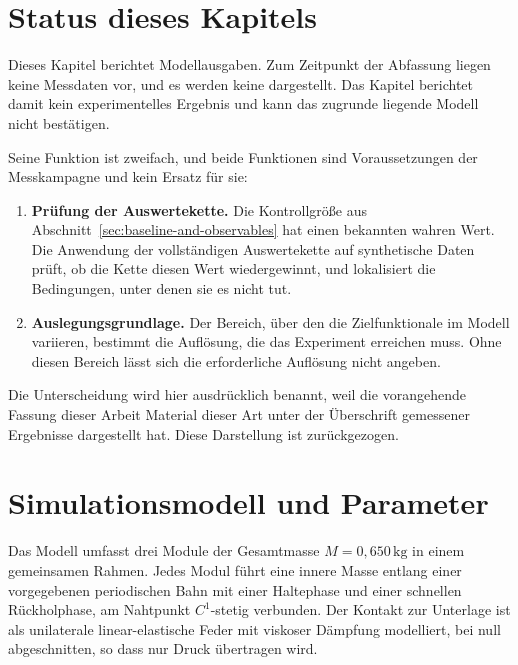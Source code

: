 \documentclass[12pt,a4paper]{report}
\begin{document}
\section{Status dieses Kapitels}

Dieses Kapitel berichtet Modellausgaben. Zum Zeitpunkt der Abfassung
liegen keine Messdaten vor, und es werden keine dargestellt. Das Kapitel
berichtet damit kein experimentelles Ergebnis und kann das zugrunde
liegende Modell nicht bestätigen.

Seine Funktion ist zweifach, und beide Funktionen sind Voraussetzungen
der Messkampagne und kein Ersatz für sie:

\begin{enumerate}
  \item \textbf{Prüfung der Auswertekette.} Die Kontrollgröße aus
        Abschnitt~\ref{sec:baseline-and-observables} hat einen bekannten
        wahren Wert. Die Anwendung der vollständigen Auswertekette auf
        synthetische Daten prüft, ob die Kette diesen Wert wiedergewinnt,
        und lokalisiert die Bedingungen, unter denen sie es nicht tut.
  \item \textbf{Auslegungsgrundlage.} Der Bereich, über den die
        Zielfunktionale im Modell variieren, bestimmt die Auflösung, die
        das Experiment erreichen muss. Ohne diesen Bereich lässt sich die
        erforderliche Auflösung nicht angeben.
\end{enumerate}

Die Unterscheidung wird hier ausdrücklich benannt, weil die vorangehende
Fassung dieser Arbeit Material dieser Art unter der Überschrift
gemessener Ergebnisse dargestellt hat. Diese Darstellung ist
zurückgezogen.

\section{Simulationsmodell und Parameter}

Das Modell umfasst drei Module der Gesamtmasse
$M = 0{,}650\,\mathrm{kg}$ in einem gemeinsamen Rahmen. Jedes Modul führt
eine innere Masse entlang einer vorgegebenen periodischen Bahn mit einer
Haltephase und einer schnellen Rückholphase, am Nahtpunkt $C^1$-stetig
verbunden. Der Kontakt zur Unterlage ist als unilaterale linear-elastische
Feder mit viskoser Dämpfung modelliert, bei null abgeschnitten, so dass
nur Druck übertragen wird.
\end{document}
